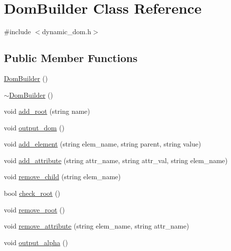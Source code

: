 \hypertarget{class_dom_builder}{}\section{Dom\+Builder Class Reference}
\label{class_dom_builder}


{\ttfamily \#include $<$dynamic\+\_\+dom.\+h$>$}

\subsection*{Public Member Functions}
\begin{DoxyCompactItemize}
\item 
\hyperlink{class_dom_builder_a653b722025dbd019c553c41e1be4d930}{Dom\+Builder} ()
\item 
\hyperlink{class_dom_builder_a6a46278e21f7780968377db97261257f}{$\sim$\+Dom\+Builder} ()
\item 
void \hyperlink{class_dom_builder_aeafe07c1532c386215f798b32086786a}{add\+\_\+root} (string name)
\item 
void \hyperlink{class_dom_builder_ae5e0f25b9b8361af412d3dea4e85f6d1}{output\+\_\+dom} ()
\item 
void \hyperlink{class_dom_builder_a1ecf962dab7557dfc29fa943b3d16948}{add\+\_\+element} (string elem\+\_\+name, string parent, string value)
\item 
void \hyperlink{class_dom_builder_a318024efd9849977c8fc357df0559993}{add\+\_\+attribute} (string attr\+\_\+name, string attr\+\_\+val, string elem\+\_\+name)
\item 
void \hyperlink{class_dom_builder_a6f8d4273e31e64720ea8ec7da2679d7a}{remove\+\_\+child} (string elem\+\_\+name)
\item 
bool \hyperlink{class_dom_builder_a4f6d575e60886c8ccd36ed2c957a2dea}{check\+\_\+root} ()
\item 
void \hyperlink{class_dom_builder_a1ce1e09ec2f69f6b63897a46c9ec054d}{remove\+\_\+root} ()
\item 
void \hyperlink{class_dom_builder_aeb5b56eb55c07ce67884b5e0e440ce05}{remove\+\_\+attribute} (string elem\+\_\+name, string attr\+\_\+name)
\item 
void \hyperlink{class_dom_builder_a536691cc93a82974cf2f4414c07dfbba}{output\+\_\+alpha} ()
\end{DoxyCompactItemize}
